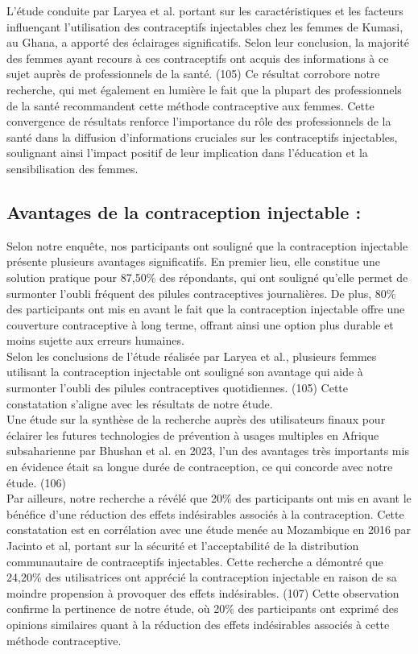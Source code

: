 \noindent L'étude conduite par Laryea et al. portant sur les caractéristiques et les facteurs influençant l'utilisation des contraceptifs injectables chez les femmes de Kumasi, au Ghana, a apporté des éclairages significatifs. Selon leur conclusion, la majorité des femmes ayant recours à ces contraceptifs ont acquis des informations à ce sujet auprès de professionnels de la santé. (105) Ce résultat corrobore notre recherche, qui met également en lumière le fait que la plupart des professionnels de la santé recommandent cette méthode contraceptive aux femmes. Cette convergence de résultats renforce l'importance du rôle des professionnels de la santé dans la diffusion d'informations cruciales sur les contraceptifs injectables, soulignant ainsi l'impact positif de leur implication dans l'éducation et la sensibilisation des femmes. 

\subsection{Avantages de la contraception injectable : }

Selon notre enquête, nos participants ont souligné que la contraception injectable présente plusieurs avantages significatifs. En premier lieu, elle constitue une solution pratique pour 87,50\% des répondants, qui ont souligné qu'elle permet de surmonter l'oubli fréquent des pilules contraceptives journalières. De plus, 80\% des participants ont mis en avant le fait que la contraception injectable offre une couverture contraceptive à long terme, offrant ainsi une option plus durable et moins sujette aux erreurs humaines.\\

\noindent Selon les conclusions de l'étude réalisée par Laryea et al., plusieurs femmes utilisant la contraception injectable ont souligné son avantage qui aide à surmonter l'oubli des pilules contraceptives quotidiennes. (105) Cette constatation s'aligne avec les résultats de notre étude.\\

\noindent Une étude sur la synthèse de la recherche auprès des utilisateurs finaux pour éclairer les futures technologies de prévention à usages multiples en Afrique subsaharienne par Bhushan et al. en 2023, l’un des avantages très importants mis en évidence était sa longue durée de contraception, ce qui concorde avec notre étude. (106)\\
 
\noindent Par ailleurs, notre recherche a révélé que 20\% des participants ont mis en avant le bénéfice d'une réduction des effets indésirables associés à la contraception. Cette constatation est en corrélation avec une étude menée au Mozambique en 2016 par Jacinto et al, portant sur la sécurité et l'acceptabilité de la distribution communautaire de contraceptifs injectables. Cette recherche a démontré que 24,20\% des utilisatrices ont apprécié la contraception injectable en raison de sa moindre propension à provoquer des effets indésirables. (107) Cette observation confirme la pertinence de notre étude, où 20\% des participants ont exprimé des opinions similaires quant à la réduction des effets indésirables associés à cette méthode contraceptive. 


